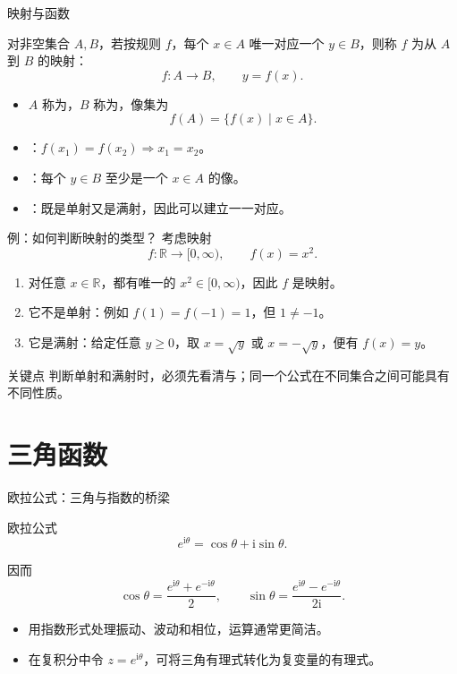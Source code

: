 \begin{frame}{映射与函数}
  \begin{definition}[映射]
    对非空集合 $A,B$，若按规则 $f$，每个 $x\in A$ 唯一对应一个 $y\in B$，则称 $f$ 为从 $A$ 到 $B$ 的映射：
    \[
      f:A\to B,\qquad y=f(x).
    \]
  \end{definition}
  \begin{itemize}
    \item $A$ 称为，$B$ 称为，像集为
    \[
      f(A)=\{f(x)\mid x\in A\}.
    \]
    \item {}：$f(x_1)=f(x_2)\Rightarrow x_1=x_2$。
    \item {}：每个 $y\in B$ 至少是一个 $x\in A$ 的像。
    \item {}：既是单射又是满射，因此可以建立一一对应。
  \end{itemize}
\end{frame}

\begin{frame}{例：如何判断映射的类型？}
  考虑映射
  \[
    f:\mathbb{R}\to[0,\infty),\qquad f(x)=x^2.
  \]
  \begin{enumerate}
    \item 对任意 $x\in\mathbb{R}$，都有唯一的 $x^2\in[0,\infty)$，因此 $f$ 是映射。
    \item 它不是单射：例如 $f(1)=f(-1)=1$，但 $1\ne-1$。
    \item 它是满射：给定任意 $y\geq0$，取 $x=\sqrt{y}$ 或 $x=-\sqrt{y}$，便有 $f(x)=y$。
  \end{enumerate}
  \begin{alertblock}{关键点}
    判断单射和满射时，必须先看清与；同一个公式在不同集合之间可能具有不同性质。
  \end{alertblock}
\end{frame}

\section{三角函数}

\begin{frame}{欧拉公式：三角与指数的桥梁}
  \begin{block}{欧拉公式}
    \[
      e^{\mathrm{i}\theta}=\cos\theta+\mathrm{i}\sin\theta.
    \]
  \end{block}
  因而
  \[
    \cos\theta=\frac{e^{\mathrm{i}\theta}+e^{-\mathrm{i}\theta}}{2},
    \qquad
    \sin\theta=\frac{e^{\mathrm{i}\theta}-e^{-\mathrm{i}\theta}}{2\mathrm{i}}.
  \]
  \begin{itemize}
    \item 用指数形式处理振动、波动和相位，运算通常更简洁。
    \item 在复积分中令 $z=e^{\mathrm{i}\theta}$，可将三角有理式转化为复变量的有理式。
  \end{itemize}
\end{frame}

